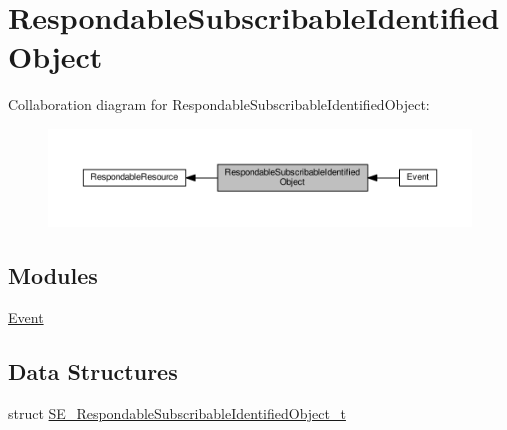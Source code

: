 \hypertarget{group__RespondableSubscribableIdentifiedObject}{}\section{Respondable\+Subscribable\+Identified\+Object}
\label{group__RespondableSubscribableIdentifiedObject}
Collaboration diagram for Respondable\+Subscribable\+Identified\+Object\+:\nopagebreak
\begin{figure}[H]
\begin{center}
\leavevmode
\includegraphics[width=350pt]{group__RespondableSubscribableIdentifiedObject}
\end{center}
\end{figure}
\subsection*{Modules}
\begin{DoxyCompactItemize}
\item 
\hyperlink{group__Event}{Event}
\end{DoxyCompactItemize}
\subsection*{Data Structures}
\begin{DoxyCompactItemize}
\item 
struct \hyperlink{structSE__RespondableSubscribableIdentifiedObject__t}{S\+E\+\_\+\+Respondable\+Subscribable\+Identified\+Object\+\_\+t}
\end{DoxyCompactItemize}

